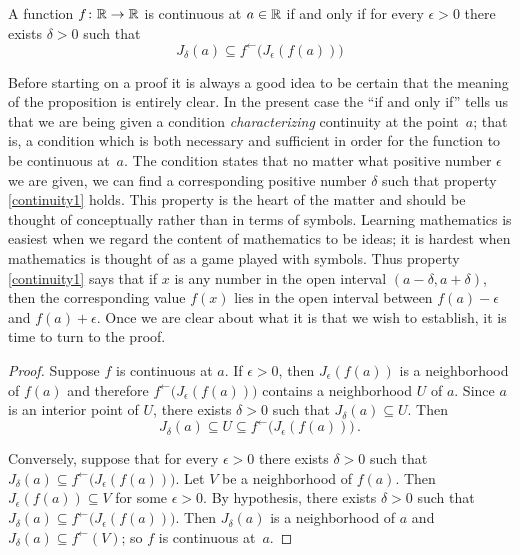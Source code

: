 \begin{prop}\label{cond1_cont} A function $f\colon\mathbb{R} \rightarrow \mathbb{R}$ is continuous at $a \in \mathbb{R}$
if and only if for every $\epsilon > 0$ there exists $\delta > 0$ such that
 \begin{equation}\label{continuity1}
        J_\delta(a) \subseteq
                   f^\gets \bigl(J_\epsilon(f(a))\bigr)
 \end{equation}
\end{prop}

Before starting on a proof it is always a good idea to be certain that the meaning of the
proposition is entirely clear.  In the present case the ``if and only if'' tells us that we
are being given a condition \emph{characterizing} continuity at the point~$a$; that is, a
condition which is both necessary and sufficient in order for the function to be continuous
at~$a$. The condition states that no matter what positive number $\epsilon$ we are given, we
can find a corresponding positive number $\delta$ such that property \eqref{continuity1}
holds. This property is the heart of the matter and should be thought of conceptually rather
than in terms of symbols.  Learning mathematics is easiest when we regard the content of
mathematics to be ideas; it is hardest when mathematics is thought of as a game played with
symbols.  Thus property \eqref{continuity1} says that if $x$ is any number in the open
interval $(a-\delta, a+\delta)$, then the corresponding value $f(x)$ lies in the open interval
between $f(a)-\epsilon$ and $f(a)+\epsilon$.  Once we are clear about what it is that we wish
to establish, it is time to turn to the proof.

\begin{proof} Suppose $f$ is continuous at $a$.  If $\epsilon > 0$, then $J_\epsilon(f(a))$
is a neighborhood of $f(a)$ and therefore $f^\gets\bigl(J_\epsilon(f(a))\bigr)$ contains a
neighborhood $U$ of $a$. Since $a$ is an interior point of $U$, there exists $\delta
> 0$ such that $J_\delta(a) \subseteq U$.  Then
  \[J_\delta(a) \subseteq U \subseteq f^\gets\bigl(J_\epsilon(f(a))\bigr)\,.\]

Conversely, suppose that for every $\epsilon > 0$ there exists $\delta > 0$ such that
$J_\delta(a) \subseteq f^\gets\bigl(J_\epsilon(f(a))\bigr)$.  Let $V$ be a neighborhood of
$f(a)$.  Then $J_\epsilon(f(a)) \subseteq V$ for some $\epsilon > 0$.  By hypothesis, there
exists $\delta > 0$ such that $J_\delta(a) \subseteq f^\gets\bigl(J_\epsilon(f(a))\bigr)$.
Then $J_\delta(a)$ is a neighborhood of $a$ and $J_\delta(a) \subseteq f^\gets(V)$; so $f$ is
continuous at~$a$.
\end{proof}

